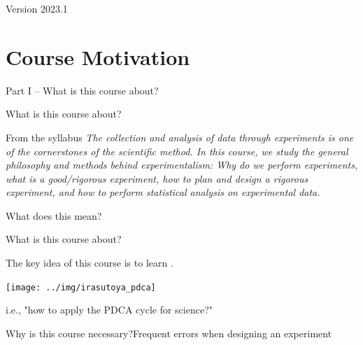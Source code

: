 \documentclass[aspectratio=169]{beamer}
\subtitle[Intro]{Topic 00 - Course Introduction}
\date{2023/04/14}
\begin{document}
\begin{CJK}{UTF8}{ipxm}

\begin{frame}
  \maketitle

  \vfill

  \hfill Version 2023.1
\end{frame}

\section{Course Motivation}

\begin{frame}
  \begin{center}
    Part I -- What is this course about?
  \end{center}
\end{frame}

\begin{frame}{What is this course about?}

  \begin{block}{From the syllabus}
    \emph{The collection and analysis of data through experiments is
      one of the cornerstones of the scientific method. In this
      course, we study the general philosophy and methods behind
      experimentalism: Why do we perform experiments, what is a
      good/rigorous experiment, how to plan and design a rigorous
      experiment, and how to perform statistical analysis on
      experimental data.}
  \end{block}
  \bigskip

  What does this mean?
\end{frame}

\begin{frame}{What is this course about?}{}

  The key idea of this course is to learn .\bigskip

  \begin{center}
    \texttt{[image: ../img/irasutoya\_pdca]}
  \end{center}\bigskip

  i.e., "how to apply the PDCA cycle for science?"
\end{frame}

\begin{frame}{Why is this course necessary?}{Frequent errors when designing an experiment}


\end{frame}
\end{CJK}
\end{document}
